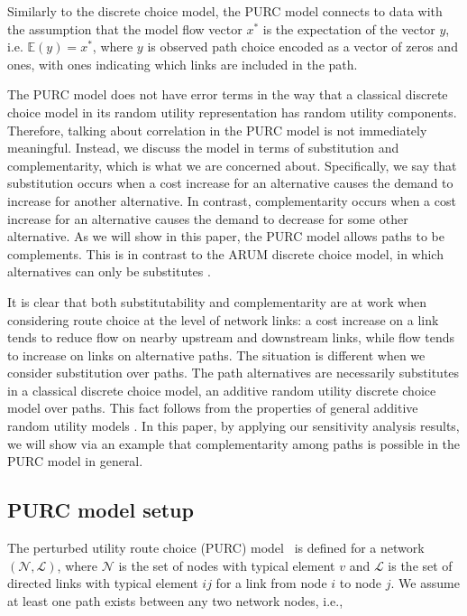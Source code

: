 \documentclass[a4paper,11pt]{article}
\begin{document}
Similarly to the discrete choice model, the PURC model connects to data with the assumption that the model flow vector $x^*$ is the expectation of the vector $y$, i.e.  $\mathbb E (y) = x^*$, where  $y$ is observed path choice encoded as a vector of zeros and ones, with ones indicating which links are included in the path.

The PURC model does not have error terms in the way that a classical discrete choice model in its random utility representation has random utility components. Therefore, talking about correlation in the PURC model is not immediately meaningful. Instead, we discuss the model in terms of substitution and complementarity, which is what we are concerned about. 
Specifically, we say that substitution occurs when a cost increase for an alternative causes the demand to increase for another alternative. In contrast, complementarity occurs when a cost increase for an alternative causes the demand to decrease for some other alternative. As we will show in this paper, the PURC model allows paths to be complements. This is in contrast to the ARUM discrete choice model, in which alternatives can only be substitutes \citep{Fosgerau2013y}. 

It is clear that both substitutability and complementarity are at work when considering route choice at the level of network links: a cost increase on a link tends to reduce flow on nearby upstream and downstream links, while flow tends to increase on links on alternative paths. The situation is different when we consider substitution over paths. The path alternatives are necessarily substitutes in a classical discrete choice model, an additive random utility discrete choice model over paths. This fact follows from the properties of general additive random utility models \citep[e.g.,][]{Fosgerau2013y}. In this paper, by applying our sensitivity analysis results, we will show via an example that complementarity among paths is possible in the PURC model in general. 


\subsection{PURC model setup}\label{sec:PURC model}

The perturbed utility route choice (PURC) model~\citep{Fosgerau2021a, fosgerau_bikeability_2023} is defined for a network $(\mathcal{N},\mathcal{L})$, where $\mathcal{N}$ is the set of nodes with typical element $v$ and $\mathcal{L}$ is the set of directed links with typical element $ij$ for a link from node $i$ to node $j$. We assume at least one path exists between any two network nodes, i.e.,
\end{document}

